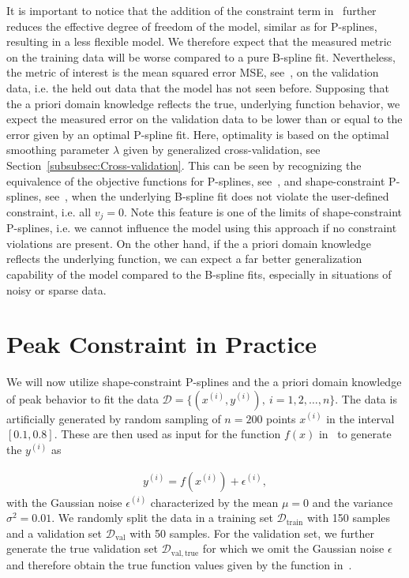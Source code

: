 It is important to notice that the addition of the constraint term in~ further reduces the effective degree of freedom of the model, similar as for P-splines, resulting in a less flexible model. We therefore expect that the measured metric on the training data will be worse compared to a pure B-spline fit. Nevertheless, the metric of interest is the mean squared error MSE, see~, on the validation data, i.e. the held out data that the model has not seen before. Supposing that the a priori domain knowledge reflects the true, underlying function behavior, we expect the measured error on the validation data to be lower than or equal to the error given by an optimal P-spline fit. Here, optimality is based on the optimal smoothing parameter $\lambda$ given by generalized cross-validation, see Section~\ref{subsubsec:Cross-validation}. This can be seen by recognizing the equivalence of the objective functions for P-splines, see~, and shape-constraint P-splines, see~, when the underlying B-spline fit does not violate the user-defined constraint, i.e. all $v_j=0$. Note this feature is one of the limits of shape-constraint P-splines, i.e. we cannot influence the model using this approach if no constraint violations are present. On the other hand, if the a priori domain knowledge reflects the underlying function, we can expect a far better generalization capability of the model compared to the B-spline fits, especially in situations of noisy or sparse data.


\section{Peak Constraint in Practice} \label{sec:peak-behav-noisy}

We will now utilize shape-constraint P-splines and the a priori domain knowledge of peak behavior to fit the data $\mathcal{D} = \{(x^{(i)}, y^{(i)}), \ i=1,2,\dots,n\}$. The data is artificially generated by random sampling of $n=200$ points $x^{(i)}$ in the interval $[0.1, 0.8]$. These are then used as input for the function $f(x)$ in~ to generate the $y^{(i)}$ as

\begin{align}
	y^{(i)} = f(x^{(i)}) + \epsilon^{(i)},
\end{align}
%
with the Gaussian noise $\epsilon^{(i)}$ characterized by the mean $\mu = 0$ and the variance $\sigma^2 = 0.01$. We randomly split the data in a training set $\mathcal{D}_{\mathrm{train}}$ with 150 samples and a validation set $\mathcal{D}_{\mathrm{val}}$ with 50 samples.  For the validation set, we further generate the true validation set $\mathcal{D}_{\mathrm{val}, \mathrm{true}}$ for which we omit the Gaussian noise $\epsilon$ and therefore obtain the true function values given by the function in~. 

